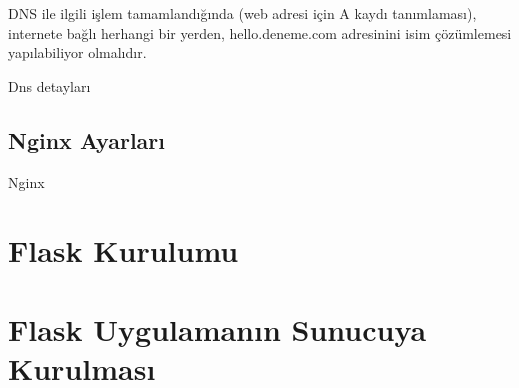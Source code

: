 \documentclass[10pt,a4paper]{book}
\begin{document}
DNS ile ilgili işlem tamamlandığında (web adresi için A kaydı tanımlaması), internete bağlı herhangi bir yerden, hello.deneme.com adresinini isim çözümlemesi yapılabiliyor olmalıdır. 


Dns detayları

\section{Nginx Ayarları}
Nginx

\chapter{Flask Kurulumu}



\chapter{Flask Uygulamanın Sunucuya Kurulması}

\printindex
\end{document}
